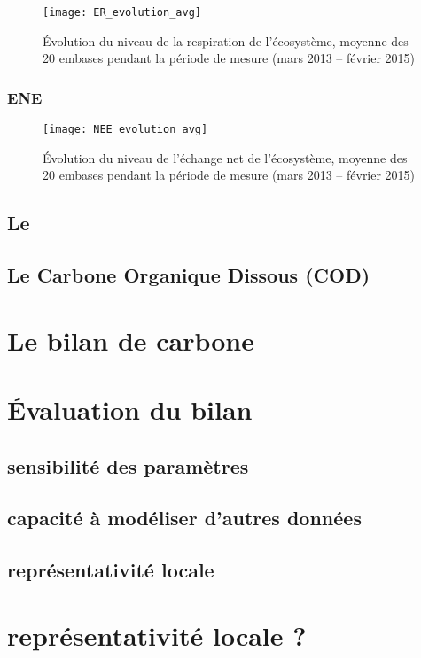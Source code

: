 \begin{figure}
\centering
\texttt{[image: ER\_evolution\_avg]}
\caption{Évolution du niveau de la respiration de l'écosystème, moyenne des 20 embases pendant la période de mesure (mars 2013 -- février 2015)}
\label{fig:ER_evolution_avg}
\end{figure}

\subsubsection{ENE}

\begin{figure}
\centering
\texttt{[image: NEE\_evolution\_avg]}
\caption{Évolution du niveau de l'échange net de l'écosystème, moyenne des 20 embases pendant la période de mesure (mars 2013 -- février 2015)}
\label{fig:NEE_evolution_avg}
\end{figure}

\subsection{Le \chh}
\subsection{Le Carbone Organique Dissous (COD)}

\section{Le bilan de carbone}

\section{Évaluation du bilan}

\subsection{sensibilité des paramètres}

\subsection{capacité à modéliser d'autres données}

\subsection{représentativité locale}

\section{représentativité locale ?}
